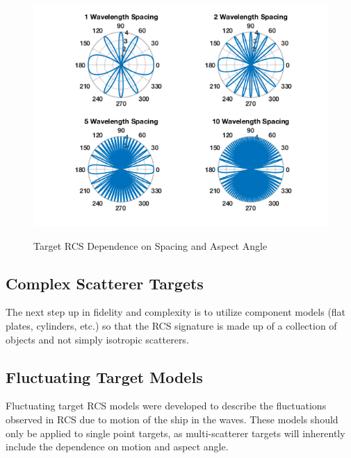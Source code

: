 \begin{figure}[H]
  \begin{center}
\includegraphics[width=5.5in]{../media/multistatic/target_rcs_2_point.png}
  \end{center}
  \renewcommand{\baselinestretch}{1} \small\normalsize
  \begin{quote}
    \caption[Target RCS Dependence on Spacing and Aspect Angle]{Target RCS Dependence on Spacing and Aspect Angle\label{env_fig:3y}}
  \end{quote}
\end{figure}
\renewcommand{\baselinestretch}{2} \small\normalsize

\subsection{Complex Scatterer Targets}
The next step up in fidelity and complexity is to utilize component models (flat plates, cylinders, etc.) so that the RCS signature is made up of a collection of objects and not simply isotropic scatterers.

\subsection{Fluctuating Target Models}\label{env_fluctuating_target_rcs}
Fluctuating target RCS models were developed to describe the fluctuations observed in RCS due to motion of the ship in the waves. These models should only be applied to single point targets, as multi-scatterer targets will inherently include the dependence on motion and aspect angle.

